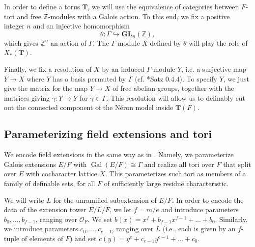 \documentclass{amsart}
\newcommand{\Z}{{\mathbb Z}}
\newcommand{\ri}{\mathcal{O}}
\DeclareMathOperator{\gal}{Gal}
\newcommand{\GL}{\mathbf {GL}}
\newcommand{\bT}{\mathbf {T}}
\theoremstyle{plain}
\theoremstyle{definition}
\begin{document}
In order to define a torus $\bT$, we will use the equivalence of categories between $F$-tori and
free $\Z$-modules with a Galois action.  To this end, we fix a positive integer $n$ and an injective homomorphism
\begin{equation} \label{eq:theta}
\theta : \Gamma \hookrightarrow \GL_n(\Z),
\end{equation}
which gives $\Z^n$ an action of $\Gamma$.  The $\Gamma$-module $X$ defined by $\theta$ will play the role of $X_\ast(\bT)$.

Finally, we fix a resolution of $X$ by an induced $\Gamma$-module $Y$, i.e. a surjective map
$Y \to X$ where $Y$ has a basis permuted by $\Gamma$ (cf. \cite{brahm:thesis}*{Satz 0.4.4}).
To specify $Y$, we just give the matrix for the map $Y \to X$ of free abelian groups,
together with the matrices giving $\gamma : Y \to Y$ for $\gamma \in \Gamma$.
This resolution will allow us to definably cut out the connected component of the N\'eron model inside $\bT(F)$.

\subsection{Parameterizing field extensions and tori}\label{sub:def_tori}
 
We encode field extensions in the same way as in \cite{CGH-2}.
Namely, we parameterize Galois extensions $E/F$ with $\gal(E/F) \cong \Gamma$
and realize all tori over $F$ that split over $E$ with cocharacter lattice $X$.
This parameterizes such tori as members of a family of definable sets,
for all $F$ of sufficiently large residue characteristic. 

We will write $L$ for the unramified subextension of $E/F$.  In order to encode the data of the extension tower $E/L/F$,
we let $f=m/e$ and introduce parameters $b_0,\dots, b_{f-1}$, ranging over $\ri_F$.
We set $b(x)=x^f+b_{f-1}x^{f-1}+ \dots + b_0$. 
Similarly, we introduce parameters $c_0, \dots, c_{e-1}$, ranging over $L$
(i.e., each is given by an $f$-tuple of elements of $F$) and set $c(y) = y^e + c_{e-1}y^{e-1} + \dots + c_0$.
\end{document}
